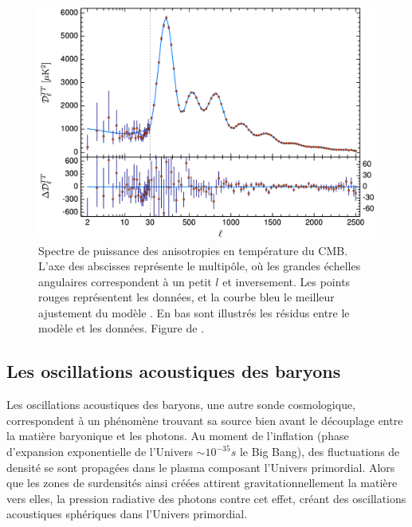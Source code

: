\documentclass[../main/main.tex]{subfiles}
\begin{document}
\begin{figure}[ht]
  \begin{minipage}[c]{0.55\textwidth}
    \includegraphics[width=\textwidth]{../figures/01_cosmology/cmbTTplanck.pdf}
  \end{minipage}\hfill
  \begin{minipage}[c]{0.44\textwidth}
    \caption[Spectre de puissance des anisotropies en température du
    CMB.]{Spectre de puissance des anisotropies en température du
    CMB. L'axe des abscisses représente le multipôle, où les grandes
    échelles angulaires correspondent à un petit $l$ et inversement. Les
    points rouges représentent les données, et la courbe bleu le
    meilleur ajustement du modèle \lcdm. En bas sont illustrés les
    résidus entre le modèle et les données. Figure de \citet{Planckparams2018}.}\label{fig:cmbTTplanck}
  \end{minipage}
\end{figure}

\subsection{Les oscillations acoustiques des baryons}

Les oscillations acoustiques des baryons, une autre sonde cosmologique,
correspondent à un phénomène trouvant sa source bien avant le découplage entre la
matière baryonique et les photons. Au moment de l'inflation (phase
d'expansion exponentielle de l'Univers $\sim10^{-35}s$ le Big Bang), des
fluctuations de densité se sont propagées dans le plasma composant l'Univers
primordial. Alors que les zones de surdensités ainsi créées attirent
gravitationnellement la matière vers elles, la pression radiative des
photons contre cet effet, créant des oscillations acoustiques sphériques
dans l'Univers primordial.
\end{document}
